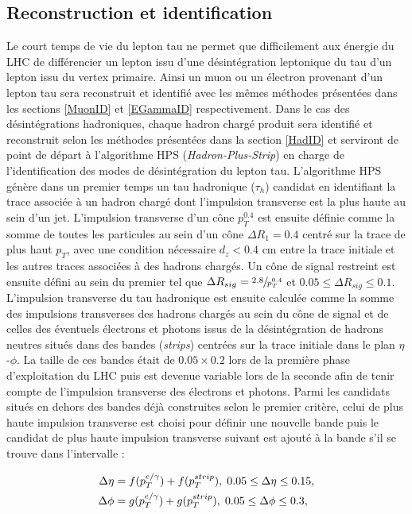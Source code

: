 \subsection{Reconstruction et identification}
\label{TauID}

Le court temps de vie du lepton tau ne permet que difficilement aux énergie du LHC de différencier un lepton issu d'une désintégration leptonique du tau d'un lepton issu du vertex primaire. Ainsi un muon ou un électron provenant d'un lepton tau sera reconstruit et identifié avec les mêmes méthodes présentées dans les sections \ref{MuonID} et \ref{EGammaID} respectivement. Dans le cas des désintégrations hadroniques, chaque hadron chargé produit sera identifié et reconstruit selon les méthodes présentées dans la section \ref{HadID} et serviront de point de départ à l'algorithme HPS (\textit{Hadron-Plus-Strip}) en charge de l'identification des modes de désintégration du lepton tau. L'algorithme HPS génère dans un premier temps un tau hadronique ($\tau_h$) candidat en identifiant la trace associée à un hadron chargé dont l'impulsion transverse est la plus haute au sein d'un jet. L'impulsion transverse d'un cône $p_T^{0.4}$ est ensuite définie comme la somme de toutes les particules au sein d'un cône $\Delta R_1 = 0.4$ centré sur la trace de plus haut $p_T$, avec une condition nécessaire $d_z<0.4$ cm entre la trace initiale et les autres traces associées à des hadrons chargés. Un cône de signal restreint est ensuite défini au sein du premier tel que $\Delta R_{sig} = \sfrac{2.8}{p_T^{0.4}}$ et $0.05\leq\Delta R_{sig}\leq 0.1$. L'impulsion transverse du tau hadronique est ensuite calculée comme la somme des impulsions transverses des hadrons chargés au sein du cône de signal et de celles des éventuels électrons et photons issus de la désintégration de hadrons neutres situés dans des bandes (\textit{strips}) centrées sur la trace initiale dans le plan $\eta$-$\phi$. La taille de ces bandes était de $0.05\times0.2$ lors de la première phase d'exploitation du LHC puis est devenue variable lors de la seconde afin de tenir compte de l'impulsion transverse des électrons et photons. Parmi les candidats situés en dehors des bandes déjà construites selon le premier critère, celui de plus haute impulsion transverse est choisi pour définir une nouvelle bande puis le candidat de plus haute impulsion transverse suivant est ajouté à la bande s'il se trouve dans l'intervalle :

\begin{align*}
    \Delta\eta & = f(p_T^{e/\gamma}) + f(p_T^{strip}),\; 0.05\leq\Delta\eta\leq0.15, \\
    \Delta\phi & = g(p_T^{e/\gamma}) + g(p_T^{strip}),\; 0.05\leq\Delta\phi\leq0.3,
    \vspace{5pt} 
\end{align*}

